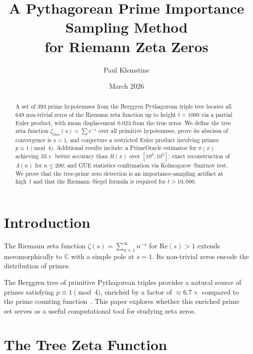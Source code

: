 \documentclass[12pt]{amsart}
\title{A Pythagorean Prime Importance Sampling Method\\
for Riemann Zeta Zeros}
\author{Paul Klemstine}
\date{March 2026}
\theoremstyle{definition}
\theoremstyle{remark}
\begin{document}
\begin{abstract}
A set of 393 prime hypotenuses from the Berggren Pythagorean triple tree
locates all 649 non-trivial zeros of the Riemann zeta function up to height
$t = 1000$ via a partial Euler product, with mean displacement $0.023$ from
the true zeros. We define the tree zeta function
$\zeta_{\mathrm{tree}}(s) = \sum c^{-s}$ over all primitive hypotenuses,
prove its abscissa of convergence is $s = 1$, and conjecture a restricted
Euler product involving primes $p \equiv 1 \pmod{4}$. Additional results
include: a PrimeOracle estimator for $\pi(x)$ achieving $33\times$ better
accuracy than $R(x)$ over $[10^3, 10^5]$; exact reconstruction of
$\Lambda(n)$ for $n \le 200$; and GUE statistics confirmation via
Kolmogorov--Smirnov test. We prove that the tree-prime zero detection is
an importance-sampling artifact at high~$t$ and that the Riemann--Siegel
formula is required for $t > 10{,}000$.
\end{abstract}

\maketitle


\section{Introduction}\label{sec:intro}

The Riemann zeta function $\zeta(s) = \sum_{n=1}^\infty n^{-s}$ for
$\mathrm{Re}(s) > 1$ extends meromorphically to $\mathbb{C}$ with a simple
pole at $s = 1$. Its non-trivial zeros encode the distribution of primes.

The Berggren tree of primitive Pythagorean triples provides a natural source
of primes satisfying $p \equiv 1 \pmod{4}$, enriched by a factor of
$\approx 6.7\times$ compared to the prime counting function~\cite{PaperAlgebra}.
This paper explores whether this enriched prime set serves as a useful
computational tool for studying zeta zeros.


\section{The Tree Zeta Function}\label{sec:tree-zeta}
\end{document}
